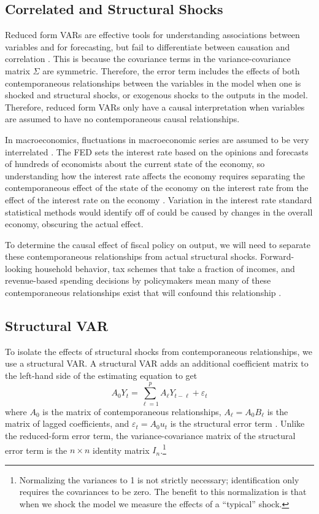 \subsection{Correlated and Structural Shocks}

Reduced form VARs are effective tools for understanding associations between variables and for forecasting, but fail to differentiate between causation and correlation \parencite{stock2001vector}. This is because the covariance terms in the variance-covariance matrix $\Sigma$ are symmetric. Therefore, the error term includes the effects of both contemporaneous relationships between the variables in the model when one is shocked and structural shocks, or exogenous shocks to the outputs in the model. Therefore, reduced form VARs only have a causal interpretation when variables are assumed to have no contemporaneous causal relationships.

In macroeconomics, fluctuations in macroeconomic series are assumed to be very interrelated \parencites{sims1980macroeconomics}{shapiro1988sources}{blanchard1988dynamic}{cochrane1994shocks}{nakamura2018identification}. The FED sets the interest rate based on the opinions and forecasts of hundreds of economists about the current state of the economy, so understanding how the interest rate affects the economy requires separating the contemporaneous effect of the state of the economy on the interest rate from the effect of the interest rate on the economy \parencite{nakamura2018identification}. Variation in the interest rate standard statistical methods would identify off of could be caused by changes in the overall economy, obscuring the actual effect.

To determine the causal effect of fiscal policy on output, we will need to separate these contemporaneous relationships from actual structural shocks. Forward-looking household behavior, tax schemes that take a fraction of incomes, and revenue-based spending decisions by policymakers mean many of these contemporaneous relationships exist that will confound this relationship \parencites{blanchard2002empirical}{gali2020effects}.


\subsection{Structural VAR} \label{subsec:svar}

To isolate the effects of structural shocks from contemporaneous relationships, we use a structural VAR. A structural VAR adds an additional coefficient matrix to the left-hand side of the estimating equation to get
\[
    A_0 Y_t = \sum_{\ell = 1}^p A_\ell Y_{t - \ell} + \varepsilon_t
\]
where $A_0$ is the matrix of contemporaneous relationships, $A_\ell = A_0 B_\ell$ is the matrix of lagged coefficients, and $\varepsilon_t = A_0 u_t$ is the structural error term \parencite{neusser2016time}. Unlike the reduced-form error term, the variance-covariance matrix of the structural error term is the $n \times n$ identity matrix $I_n$.\footnote{Normalizing the variances to 1 is not strictly necessary; identification only requires the covariances to be zero. The benefit to this normalization is that when we shock the model we measure the effects of a ``typical'' shock.}

